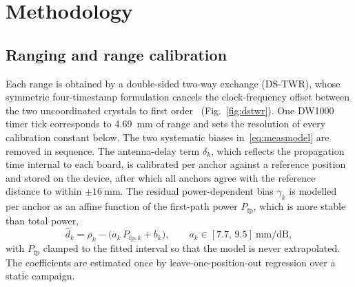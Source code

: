 \section{Methodology}
\label{sec:method}

\subsection{Ranging and range calibration}
Each range is obtained by a double-sided two-way exchange (DS-TWR),
whose symmetric four-timestamp formulation cancels the clock-frequency
offset between the two uncoordinated crystals to first
order~\cite{dstwr_neirynck} (Fig.~\ref{fig:dstwr}). One DW1000 timer
tick corresponds to \SI{4.69}{\milli\meter} of range and sets the
resolution of every calibration constant below. The two systematic
biases in~\eqref{eq:measmodel} are removed in sequence. The
antenna-delay term $\delta_k$, which reflects the propagation time
internal to each board, is calibrated per anchor against a reference
position and stored on the device, after which all anchors agree with
the reference distance to within $\pm\SI{16}{\milli\meter}$. The
residual power-dependent bias $\gamma_k$ is modelled per anchor as an
affine function of the first-path power $P_{\mathrm{fp}}$, which is more
stable than total power,
\begin{equation}
  \hat{d}_k = \rho_k - \big(a_k\,P_{\mathrm{fp},k} + b_k\big),
  \qquad a_k\in[7.7,\,9.5]\ \si{\milli\meter\per\dB},
  \label{eq:power}
\end{equation}
with $P_{\mathrm{fp}}$ clamped to the fitted interval so that the model
is never extrapolated. The coefficients are estimated once by
leave-one-position-out regression over a static campaign.

